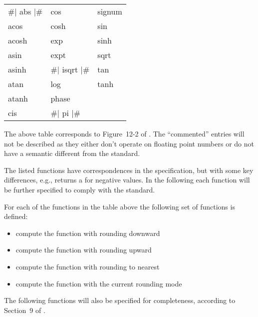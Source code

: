 \documentclass[../../Operations.tex]{subfiles}
\begin{document}
\label{sect:transc-ops}

\begin{tt}
  \begin{tabular}{lll}
    \#| abs |\# & cos & signum\\
    acos &  cosh &  sin\\
    acosh & exp  &  sinh\\
    asin &  expt &  sqrt\\
    asinh & \#| isqrt |\# &  tan\\
    atan &  log &   tanh\\
    atanh & phase & \\
    cis & \#| pi |\# & \\
  \end{tabular}
\end{tt}

\vspace*{3mm}

\noindent
The above table corresponds to Figure~12-2 of \cite{1996:ANSIHyperSpec}.
The ``commented'' entries will not be described as they either don't
operate on floating point numbers or do not have a semantic different
from the \CL{} standard.

\noindent
The listed \CL{} functions have correspondences in the \cite{2008:IEEE-754}
specification, but with some key differences, e.g.,  returns
a  for negative values.  In the following each
function will be further specified to comply with the \cite{2008:IEEE-754}
standard.


\noindent
For each of the functions in the table above the following set of functions is
defined:
\begin{itemize}
  \item {} compute the function with rounding downward
  \item {} compute the function with rounding upward
  \item {} compute the function with rounding to nearest
  \item {} compute the function with the current rounding mode
\end{itemize}
\vspace*{3mm}

The following functions will also be specified for completeness,
according to Section~9 of \cite{2008:IEEE-754}.









\end{document}
